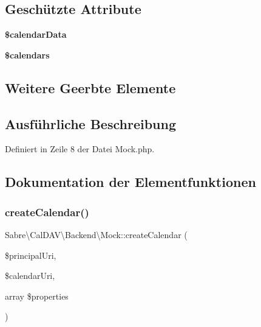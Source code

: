 \subsection*{Geschützte Attribute}
\begin{DoxyCompactItemize}
\item 
\mbox{\label{class_sabre_1_1_cal_d_a_v_1_1_backend_1_1_mock_aea7508f493e05ebd88d5f3d782fd15a5}} 
{\bfseries \$calendar\+Data}
\item 
\mbox{\label{class_sabre_1_1_cal_d_a_v_1_1_backend_1_1_mock_a8c1f892bdb0f1b3d892c0a4e23062a80}} 
{\bfseries \$calendars}
\end{DoxyCompactItemize}
\subsection*{Weitere Geerbte Elemente}


\subsection{Ausführliche Beschreibung}


Definiert in Zeile 8 der Datei Mock.\+php.



\subsection{Dokumentation der Elementfunktionen}
\mbox{\label{class_sabre_1_1_cal_d_a_v_1_1_backend_1_1_mock_adbaaeee2f6d41b5cc388f2935a42e90d}} 
\subsubsection{\texorpdfstring{create\+Calendar()}{createCalendar()}}
{\footnotesize\ttfamily Sabre\textbackslash{}\+Cal\+D\+A\+V\textbackslash{}\+Backend\textbackslash{}\+Mock\+::create\+Calendar (\begin{DoxyParamCaption}\item[{}]{\$principal\+Uri,  }\item[{}]{\$calendar\+Uri,  }\item[{array}]{\$properties }\end{DoxyParamCaption})}

